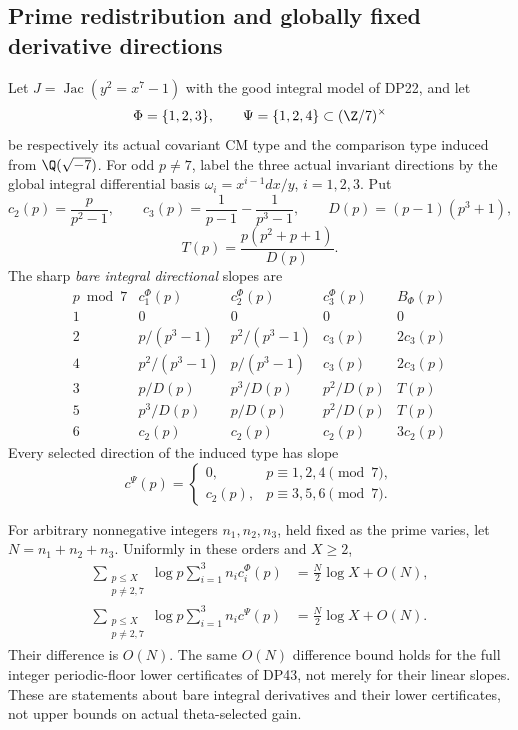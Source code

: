 \subsection{Prime redistribution and globally fixed derivative directions}

\begin{theorem}\label{DP53}
Let $J=\operatorname{Jac}(y^2=x^7-1)$ with the good integral model of DP22, and let
\[
 \Phi=\{1,2,3\},\qquad\Psi=\{1,2,4\}
       \subset(\Z/7)^\times
\]
be respectively its actual covariant CM type and the comparison type induced from $\Q(\sqrt{-7})$.
For odd $p\ne7$, label the three actual invariant directions by the global integral differential basis
$\omega_i=x^{i-1}dx/y$, $i=1,2,3$.
Put
\[
 c_2(p)=\frac{p}{p^2-1},\qquad
 c_3(p)=\frac1{p-1}-\frac1{p^3-1},\qquad
 D(p)=(p-1)(p^3+1),
\]
\[
 T(p)=\frac{p(p^2+p+1)}{D(p)}.
\]
The sharp \emph{bare integral directional} slopes are
\[
\begin{array}{c|ccc|c}
p\bmod7&c_1^\Phi(p)&c_2^\Phi(p)&c_3^\Phi(p)&B_\Phi(p)\\\hline
1&0&0&0&0\\
2&p/(p^3-1)&p^2/(p^3-1)&c_3(p)&2c_3(p)\\
4&p^2/(p^3-1)&p/(p^3-1)&c_3(p)&2c_3(p)\\
3&p/D(p)&p^3/D(p)&p^2/D(p)&T(p)\\
5&p^3/D(p)&p/D(p)&p^2/D(p)&T(p)\\
6&c_2(p)&c_2(p)&c_2(p)&3c_2(p)
\end{array}
\]
Every selected direction of the induced type has slope
\[
 c^\Psi(p)=
 \begin{cases}0,&p\equiv1,2,4\pmod7,\\
 c_2(p),&p\equiv3,5,6\pmod7.\end{cases}
\]

For arbitrary nonnegative integers $n_1,n_2,n_3$, held fixed as the prime varies, let $N=n_1+n_2+n_3$. Uniformly in these orders and $X\ge2$,
\begin{align}
 \sum_{\substack{p\le X\\p\ne2,7}}\log p
       \sum_{i=1}^3 n_i c_i^\Phi(p)
       &=\frac N2\log X+O(N),\label{eq:cmprimeactual}\\
 \sum_{\substack{p\le X\\p\ne2,7}}\log p
       \sum_{i=1}^3 n_i c^\Psi(p)
       &=\frac N2\log X+O(N).\label{eq:cmprimeinduced}
\end{align}
Their difference is $O(N)$. The same $O(N)$ difference bound holds for the full integer periodic-floor lower certificates of DP43, not merely for their linear slopes.
These are statements about bare integral derivatives and their lower certificates, not upper bounds on actual theta-selected gain.
\end{theorem}


